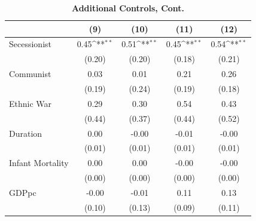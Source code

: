 \documentclass[12pt, letterpaper]{article}
\begin{document}
\newpage
\begin{table}[htbp]\centering
\begin{small}
\def\sym#1{\ifmmode^{#1}\else\(^{#1}\)\fi}
\setcounter{table}{5}
\makeatletter
\def\myrow{}
\CT@everycr{\noalign{%
\global\let\CT@row@color\relax
\stepcounter{mym4}%
\ifnum\value{mym4}=2
  \gdef\myrow{\rowcolor{gray!50}}
\else\ifnum\value{mym4}=4
  \gdef\myrow{}
\fi\fi
}\myrow}
\renewcommand\thetable{A.\Roman{table}}
\caption{\textbf{Additional Controls, Cont.}}
\label{table:addcontrols2}
\begin{tabular}{l*{4}{c}}
\hline\hline
                    &\multicolumn{1}{c}{(9)}&\multicolumn{1}{c}{(10)}&\multicolumn{1}{c}{(11)}&\multicolumn{1}{c}{(12)}\\
\hline
Secessionist      &        0.45\sym{**} &        0.51\sym{**} &        0.45\sym{**} &        0.54\sym{**} \\
                    &      (0.20)         &      (0.20)         &      (0.18)         &      (0.21)         \\
Communist           &        0.03         &        0.01         &        0.21         &        0.26         \\
                    &      (0.19)         &      (0.24)         &      (0.19)         &      (0.18)         \\
Ethnic War          &        0.29         &        0.30         &        0.54         &        0.43         \\
                    &      (0.44)         &      (0.37)         &      (0.44)         &      (0.52)         \\
Duration            &        0.00         &       -0.00         &       -0.01         &       -0.00         \\
                    &      (0.01)         &      (0.01)         &      (0.01)         &      (0.01)         \\
Infant Mortality    &        0.00         &        0.00         &       -0.00         &       -0.00         \\
                    &      (0.00)         &      (0.00)         &      (0.00)         &      (0.00)         \\
GDPpc               &       -0.00         &       -0.01         &        0.11         &        0.13         \\
                    &      (0.10)         &      (0.13)         &      (0.09)         &      (0.11)         \\

\end{tabular}
\end{small}
\end{table}
\end{document}
